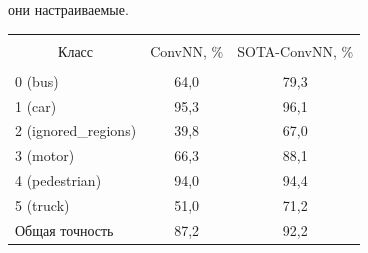 они настраиваемые.





\begin{table}\small %


  \begin{center}


    \parbox{240pt}{


}





  \vspace*{2ex}


  


  \begin{tabular}{|l|c|c|}


  \hline


  &&\\[-9pt]


  \multicolumn{1}{|c|}{Класс}&ConvNN, \%&SOTA-ConvNN, \%\\


  \hline


  &&\\[-9pt]


  0 (bus)&64,0&79,3\\


  1 (car)&95,3&96,1\\


  2 (ignored\_regions)&39,8&67,0\\


  3 (motor)&66,3&88,1\\


  4 (pedestrian)&94,0&94,4\\


  5 (truck)&51,0&71,2\\


  \hline


  Общая точность&87,2&92,2\\


  \hline


  \end{tabular}


  \end{center}


  \end{table}


  


